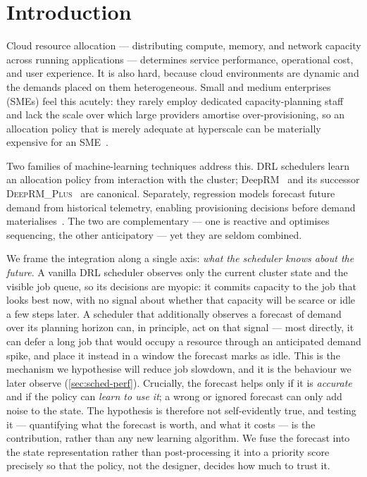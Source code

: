 \documentclass[runningheads]{llncs}
\newcommand{\deeprm}{\textsc{DeepRM\_Plus}}
\begin{document}
\section{Introduction}
Cloud resource allocation --- distributing compute, memory, and network
capacity across running applications --- determines service
performance, operational cost, and user experience. It is also hard,
because cloud environments are dynamic and the demands placed on them
heterogeneous. Small and medium enterprises (SMEs) feel this acutely:
they rarely employ dedicated capacity-planning staff and lack the scale
over which large providers amortise over-provisioning, so an allocation
policy that is merely adequate at hyperscale can be materially
expensive for an SME~\cite{osypanka2022}.

Two families of machine-learning techniques address this. DRL
schedulers learn an allocation policy from interaction with the
cluster; DeepRM~\cite{mao2016} and its successor
\deeprm{}~\cite{guo2021} are canonical. Separately, regression models
forecast future demand from historical telemetry, enabling
provisioning decisions before demand
materialises~\cite{bankole2013,kaur2019}. The two are complementary ---
one is reactive and optimises sequencing, the other anticipatory --- yet
they are seldom combined.

We frame the integration along a single axis: \emph{what the scheduler
knows about the future}. A vanilla DRL scheduler observes only the
current cluster state and the visible job queue, so its decisions are
myopic: it commits capacity to the job that looks best now, with no
signal about whether that capacity will be scarce or idle a few steps
later. A scheduler that additionally observes a forecast of demand over
its planning horizon can, in principle, act on that signal --- most
directly, it can defer a long job that would occupy a resource through
an anticipated demand spike, and place it instead in a window the
forecast marks as idle. This is the mechanism we hypothesise will
reduce job slowdown, and it is the behaviour we later observe
(\cref{sec:sched-perf}). Crucially, the forecast helps only if it is
\emph{accurate} and if the policy can \emph{learn to use it}; a wrong
or ignored forecast can only add noise to the state. The hypothesis is
therefore not self-evidently true, and testing it --- quantifying what
the forecast is worth, and what it costs --- is the contribution, rather
than any new learning algorithm. We fuse the forecast into the state
representation rather than post-processing it into a priority score
precisely so that the policy, not the designer, decides how much to
trust it.
\end{document}
